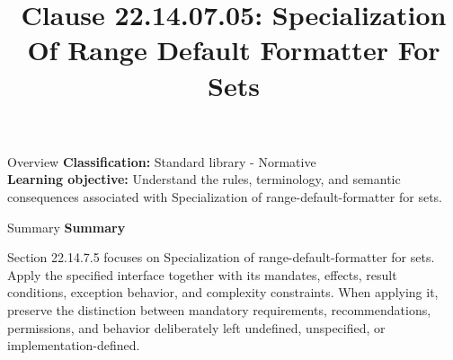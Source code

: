\documentclass[10pt,letterpaper]{article}
\title{Clause 22.14.07.05: Specialization Of Range Default Formatter For Sets}
\author{}
\date{}
\begin{document}
\maketitle
\begin{CornellOverviewBox}{Overview}
\textbf{Classification:} Standard library - Normative\\[2pt]
\textbf{Learning objective:} Understand the rules, terminology, and semantic consequences associated with Specialization of range-default-formatter for sets.
\end{CornellOverviewBox}\begin{CornellSummaryBox}{Summary}
{\sffamily\bfseries\color{Accent} Summary}\par\vspace{3pt}Section 22.14.7.5 focuses on Specialization of range-default-formatter for sets. Apply the specified interface together with its mandates, effects, result conditions, exception behavior, and complexity constraints. When applying it, preserve the distinction between mandatory requirements, recommendations, permissions, and behavior deliberately left undefined, unspecified, or implementation-defined.
\end{CornellSummaryBox}
\end{document}
